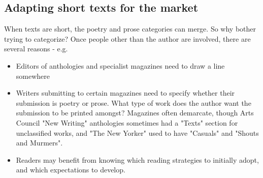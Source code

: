 \documentclass[11pt]{article}
\begin{document}
\newpage\subsection{Adapting short texts for the market}
When texts are short, the poetry and prose categories can merge. So why bother trying to categorize? Once people other than the author are involved, there are several reasons - e.g. 

\begin{itemize}
\item Editors of anthologies and specialist magazines need to draw a line somewhere
\item Writers submitting to certain magazines need to specify whether their submission is poetry or prose. What type of work does the author want the submission to be printed amongst? Magazines often demarcate, though Arts Council "New Writing" anthologies sometimes had a "Texts" section for unclassified works, and "The New Yorker" used to have "Casuals" and "Shouts and Murmers".
\item Readers may benefit from knowing which reading strategies to initially adopt, and which expectations to develop.
\end{itemize}
\end{document}
